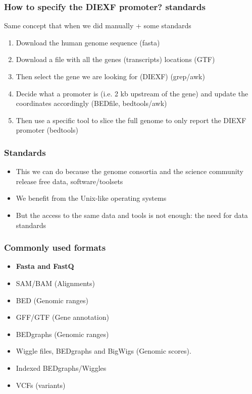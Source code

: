 \documentclass{beamer}
\begin{document}
\begin{frame}
  \frametitle{How to specify the DIEXF promoter? standards}
  Same concept that when we did manually + some standards
  \begin{enumerate}
  \item Download the human genome sequence (fasta)
  \item Download a file with all the genes (transcripts) locations (GTF)
  \item Then select the gene we are looking for (DIEXF) (grep/awk)
  \item Decide what a promoter is (i.e. 2 kb upstream of the gene) and update the coordinates accordingly (BEDfile, bedtools/awk)
  \item Then use a specific tool to slice the full genome to only report the DIEXF promoter (bedtools)
  \end{enumerate}
\end{frame}

\begin{frame}
  \frametitle{Standards}
  \begin{itemize}
  \item This we can do because the genome consortia and the science community release free data, software/toolsets
  \item We benefit from the Unix-like operating systems
  \item But the access to the same data and tools is not enough: the need for data standards 
  \end{itemize}
\end{frame}

\begin{frame}
  \frametitle{Commonly used formats}
  \begin{itemize}

  \item \textbf{Fasta and FastQ}
 
  \item SAM/BAM (Alignments)
 
  \item BED (Genomic ranges)
 
  \item GFF/GTF (Gene annotation)
 
  \item BEDgraphs (Genomic ranges)
 
  \item Wiggle files, BEDgraphs and BigWigs (Genomic scores).
 
  \item Indexed BEDgraphs/Wiggles

  \item VCFs (variants)

  \end{itemize}
\end{frame}
\end{document}
